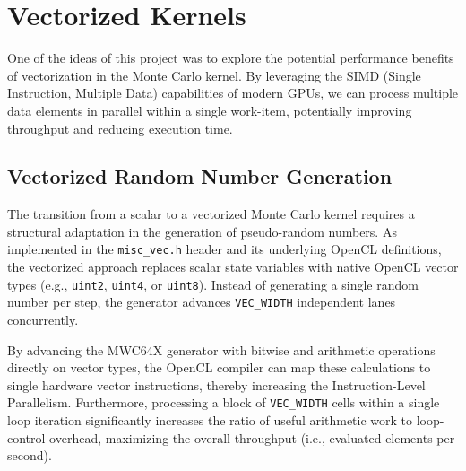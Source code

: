 \section{Vectorized Kernels}\label{sec:vectorized_kernels}
One of the ideas of this project was to explore the potential performance benefits of vectorization in the Monte Carlo kernel. By leveraging the SIMD (Single Instruction, Multiple Data) capabilities of modern GPUs, we can process multiple data elements in parallel within a single work-item, potentially improving throughput and reducing execution time.

\subsection{Vectorized Random Number Generation}\label{subsec:vectorized_rng}
The transition from a scalar to a vectorized Monte Carlo kernel requires a structural adaptation in the generation of pseudo-random numbers. As implemented in the \texttt{misc\_vec.h} header and its underlying OpenCL definitions, the vectorized approach replaces scalar state variables with native OpenCL vector types (e.g., \texttt{uint2}, \texttt{uint4}, or \texttt{uint8}). Instead of generating a single random number per step, the generator advances \texttt{VEC\_WIDTH} independent lanes concurrently.

By advancing the MWC64X generator with bitwise and arithmetic operations directly on vector types, the OpenCL compiler can map these calculations to single hardware vector instructions, thereby increasing the Instruction-Level Parallelism. Furthermore, processing a block of \texttt{VEC\_WIDTH} cells within a single loop iteration significantly increases the ratio of useful arithmetic work to loop-control overhead, maximizing the overall throughput (i.e., evaluated elements per second).

